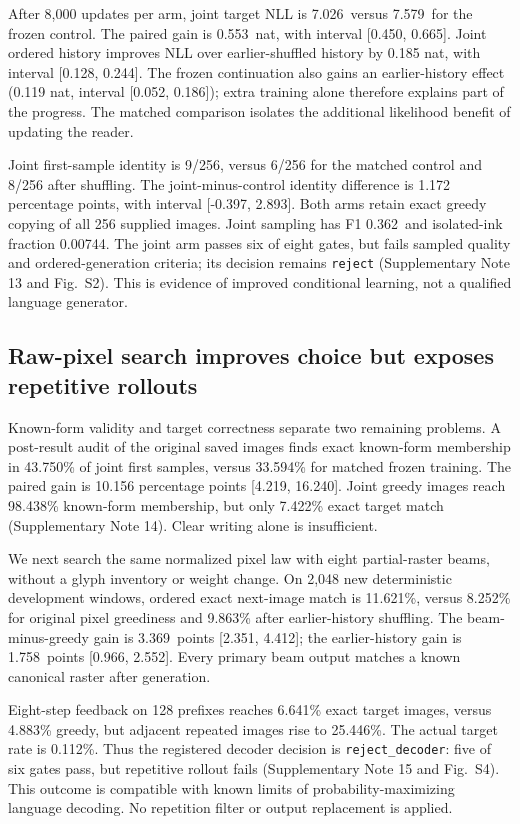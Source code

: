 \documentclass[12pt,a4paper]{article}
\newcommand{\JointNll}{7.026}
\newcommand{\ControlNll}{7.579}
\newcommand{\JointNllGain}{0.553}
\newcommand{\JointNllLow}{0.450}
\newcommand{\JointNllHigh}{0.665}
\newcommand{\JointSampleFone}{0.362}
\newcommand{\JointDecision}{reject}
\newcommand{\BeamAccuracy}{11.621}
\newcommand{\BeamShuffled}{9.863}
\newcommand{\GreedyAccuracy}{8.252}
\newcommand{\BeamGain}{3.369}
\newcommand{\BeamGainLow}{2.351}
\newcommand{\BeamGainHigh}{4.412}
\newcommand{\BeamHistoryGain}{1.758}
\newcommand{\BeamHistoryLow}{0.966}
\newcommand{\BeamHistoryHigh}{2.552}
\newcommand{\BeamRepeat}{25.446}
\newcommand{\TargetRepeat}{0.112}
\newcommand{\BeamDecision}{reject\_decoder}
\begin{document}
After 8,000 updates per arm, joint target NLL is \JointNll\ versus
\ControlNll\ for the frozen control. The paired gain is \JointNllGain\ nat,
with interval [\JointNllLow, \JointNllHigh]. Joint ordered history improves
NLL over earlier-shuffled history by 0.185 nat, with interval [0.128, 0.244].
The frozen continuation also gains an earlier-history effect (0.119 nat,
interval [0.052, 0.186]); extra training alone therefore explains part of the
progress. The matched comparison isolates the additional likelihood benefit
of updating the reader.

Joint first-sample identity is 9/256, versus 6/256 for the matched control and
8/256 after shuffling. The joint-minus-control identity difference is 1.172
percentage points, with interval [-0.397, 2.893]. Both arms retain exact greedy
copying of all 256 supplied images. Joint sampling has F1 \JointSampleFone\
and isolated-ink fraction 0.00744. The joint arm passes six of eight gates,
but fails sampled quality and ordered-generation criteria; its decision remains
\texttt{\JointDecision} (Supplementary Note 13 and Fig.~S2).
This is evidence of improved conditional learning, not a qualified language
generator.

\subsection*{Raw-pixel search improves choice but exposes repetitive rollouts}
Known-form validity and target correctness separate two remaining problems.
A post-result audit of the original saved images finds exact known-form
membership in 43.750\% of joint first samples, versus 33.594\% for matched
frozen training. The paired gain is 10.156 percentage points [4.219, 16.240].
Joint greedy images reach 98.438\% known-form membership, but only 7.422\%
exact target match (Supplementary Note 14). Clear writing alone is insufficient.

We next search the same normalized pixel law with eight partial-raster beams,
without a glyph inventory or weight change. On 2,048 new deterministic
development windows, ordered exact next-image match is \BeamAccuracy\%,
versus \GreedyAccuracy\% for original pixel greediness and \BeamShuffled\%
after earlier-history shuffling. The beam-minus-greedy gain is \BeamGain\
points [\BeamGainLow, \BeamGainHigh]; the earlier-history gain is
\BeamHistoryGain\ points [\BeamHistoryLow, \BeamHistoryHigh]. Every primary
beam output matches a known canonical raster after generation.

Eight-step feedback on 128 prefixes reaches 6.641\% exact target images,
versus 4.883\% greedy, but adjacent repeated images rise to \BeamRepeat\%.
The actual target rate is \TargetRepeat\%. Thus the registered decoder
decision is \texttt{\BeamDecision}: five of six gates pass, but repetitive
rollout fails (Supplementary Note 15 and Fig.~S4). This outcome is compatible
with known limits of probability-maximizing language decoding\cite{degeneration}.
No repetition filter or output replacement is applied.
\end{document}
